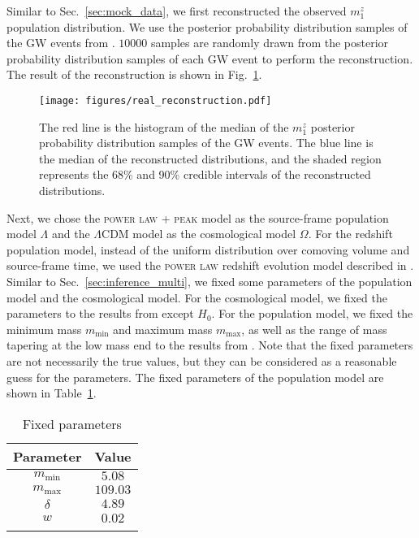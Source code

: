 \documentclass[sn-aps, pdflatex]{sn-jnl}
\begin{document}
Similar to Sec.~\ref{sec:mock_data}, we first reconstructed the observed $m^z_1$ population distribution.
We use the posterior probability distribution samples of the \ac{GW} events from \cite{LIGOScientific:2019lzm, KAGRA:2023pio}.
$10000$ samples are randomly drawn from the posterior probability distribution samples of each \ac{GW} event to perform the reconstruction.
The result of the reconstruction is shown in Fig.~\ref{fig:real_reconstruction}.
\begin{figure}[htbp]
    \texttt{[image: figures/real\_reconstruction.pdf]}
    \caption{
        The red line is the histogram of the median of the $m^z_1$ posterior probability distribution samples of the \ac{GW} events.
        The blue line is the median of the reconstructed distributions, and the shaded region represents the 68\% and 90\% credible intervals of the reconstructed distributions.
    }
    \label{fig:real_reconstruction}
\end{figure}

Next, we chose the \textsc{power law + peak} model as the source-frame population model $\Lambda$ and the $\Lambda$CDM model as the cosmological model $\Omega$.
For the redshift population model, instead of the uniform distribution over comoving volume and source-frame time, we used the \textsc{power law} redshift evolution model described in \cite{KAGRA:2021duu}.
Similar to Sec.~\ref{sec:inference_multi}, we fixed some parameters of the population model and the cosmological model.
For the cosmological model, we fixed the parameters to the results from \cite{Planck:2018vyg} except $H_0$.
For the population model, we fixed the minimum mass $m_\mathrm{min}$ and maximum mass $m_\mathrm{max}$, as well as the range of mass tapering at the low mass end to the results from \cite{LIGOScientific:2021aug}.
Note that the fixed parameters are not necessarily the true values, but they can be considered as a reasonable guess for the parameters.
The fixed parameters of the population model are shown in Table~\ref{tab:fixed_parameters}.
\begin{table}[htbp]
    \caption{Fixed parameters}
    \begin{tabular}{cc}
        \toprule
        Parameter & Value \\
        \midrule
        $m_\mathrm{min}$ & $5.08$ \\
        $m_\mathrm{max}$ & $109.03$ \\
        $\delta$ & $4.89$ \\
        $w$ & $0.02$ \\
        \botrule
    \end{tabular}
    \label{tab:fixed_parameters}
\end{table}
\end{document}
